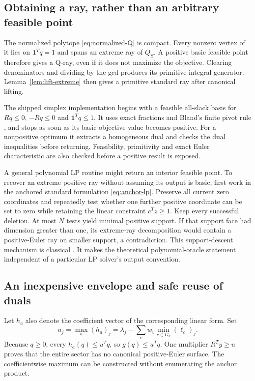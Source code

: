 \subsection{Obtaining a ray, rather than an arbitrary feasible point}

The normalized polytope \eqref{eq:normalized-Q} is compact. Every nonzero vertex of it lies on $\mathbf1^Tq=1$ and spans an extreme ray of $Q_S$. A positive basic feasible point therefore gives a Q-ray, even if it does not maximize the objective. Clearing denominators and dividing by the gcd produces its primitive integral generator. Lemma~\ref{lem:lift-extreme} then gives a primitive standard ray after canonical lifting.

The shipped simplex implementation begins with a feasible all-slack basis for $Rq\le0$, $-Rq\le0$ and $\mathbf1^Tq\le1$. It uses exact fractions and Bland's finite pivot rule \cite{Bland}, and stops as soon as its basic objective value becomes positive. For a nonpositive optimum it extracts a homogeneous dual and checks the dual inequalities before returning. Feasibility, primitivity and exact Euler characteristic are also checked before a positive result is exposed.

A general polynomial LP routine might return an interior feasible point. To recover an extreme positive ray without assuming its output is basic, first work in the anchored standard formulation \eqref{eq:anchor-lp}. Preserve all current zero coordinates and repeatedly test whether one further positive coordinate can be set to zero while retaining the linear constraint $c^Tz\ge1$. Keep every successful deletion. At most $N$ tests yield minimal positive support. If that support face had dimension greater than one, its extreme-ray decomposition would contain a positive-Euler ray on smaller support, a contradiction. This support-descent mechanism is classical \cite{BO}. It makes the theoretical polynomial-oracle statement independent of a particular LP solver's output convention.

\subsection{An inexpensive envelope and safe reuse of duals}

Let $h_a$ also denote the coefficient vector of the corresponding linear form. Set
\begin{equation}\label{eq:envelope}
 u_j=\max_a(h_a)_j
     =\lambda_j-\sum_vw_v\min_{c\in G_v}(\ell_c)_j.
\end{equation}
Because $q\ge0$, every $h_a(q)\le u^Tq$, so $g(q)\le u^Tq$. One multiplier $R^Ty\ge u$ proves that the entire sector has no canonical positive-Euler surface. The coefficientwise maximum can be constructed without enumerating the anchor product.

